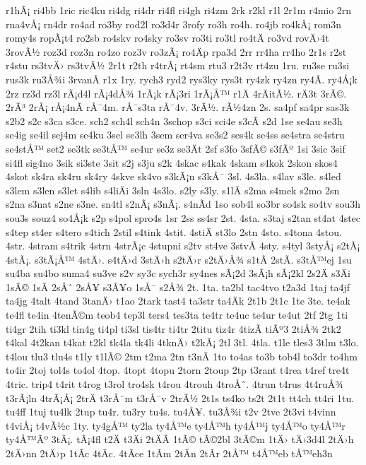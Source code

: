 {r1hÃ¡
ri4bb
1ric
ric4ku
ri4dg
ri4dr
ri4fl
ri4gh
ri4zm
2rk
r2kl
r1l
2r1m
r4mio
2rn
rna4vÅ¡
rn4dr
ro4ad
ro3by
rod2l
ro3d4r
3rofy
ro3h
ro4h.
ro4jb
ro4kÅ¡
rom3n
romy4s
ropÃ¡t4
ro2sb
ro4skv
ro4sky
ro3sv
ro3ti
ro3tl
ro4tÄ
ro3vd
rovÄ›4t
3rovÃ½
roz3d
roz3n
ro4zo
roz3v
ro3zÃ¡
ro4Äp
rpa3d
2rr
rr4ha
rr4ho
2r1s
r2st
r4stu
rs3tvÄ›
rs3tvÃ½
2r1t
r2th
r4trÃ¡
rt4sm
rtu3
r2t3v
rt4zu
1ru.
ru3se
ru3si
rus3k
ru3Å¾i
3rvanÃ­
r1x
1ry.
rych3
ryd2
rys3ky
rys3t
ry4zk
ry4zn
ry4Ã­.
ry4Å¡k
2rz
rz3d
rz3l
rÃ¡d4l
rÃ¡4dÅ¾
1rÃ¡k
rÃ¡3ri
1rÃ¡Å™
r1Ä
4rÄitÃ½.
rÄ3t
3rÃ©.
2rÃ³
2rÅ¡
rÅ¡4nÃ­
rÅ¯4m.
rÅ¯s3ta
rÅ¯4v.
3rÃ½.
rÃ½4zn
2s.
sa4pf
sa4pr
sas3k
s2b2
s2c
s3ca
s3ce.
sch2
sch4l
sch4n
3schop
s3ci
sci4e
s3cÃ­
s2d
1se
se4au
se3h
se4ig
se4il
sej4m
se4ku
3sel
se3lh
3sem
ser4va
se3s2
ses4k
se4ss
se4stra
se4stru
se4stÅ™
set2
se3tk
se3tÅ™
se4ur
se3z
se3Ät
2sf
s3fo
3sfÃ©
s3fÃº
1si
3sic
3sif
si4fl
sig4no
3sik
si3ste
3sit
s2j
s3ju
s2k
4skac
s4kak
4skam
s4kok
2skon
skos4
4skot
sk4ra
sk4ru
sk4ry
4skve
sk4vo
s3kÃ¡n
s3kÅ¯
3sl.
4s3la.
s4lav
s3le.
s4led
s3lem
s3len
s3let
s4lib
s4liÄi
3sln
4s3lo.
s2ly
s3ly.
s1lÃ­
s2ma
s4mek
s2mo
2sn
s2na
s3nat
s2ne
s3ne.
sn4tl
s2nÃ¡
s3nÃ¡.
s4nÃ­d
1so
sob4l
so3br
so4sk
so4tv
sou3h
sou3s
souz4
so4Å¡k
s2p
s4pol
spro4s
1sr
2ss
ss4sr
2st.
4sta.
s3taj
s2tan
st4at
4stec
s4tep
st4er
s4tero
s4tich
2stil
s4tink
4stit.
4stiÄ
st3lo
2stn
4sto.
s4tona
4stou.
4str.
4stram
s4trik
4strn
4strÃ¡c
4stupni
s2tv
st4ve
3stvÃ­
4sty.
s4tyl
3styÅ¡
s2tÃ¡
4stÃ¡.
s3tÃ¡Å™
4stÄ›.
s4tÄ›d
3stÄ›h
s2tÄ›r
s2tÄ›Å¾
s1tÃ­
2stÃ­.
s3tÅ™ej
1su
su4ba
su4bo
suma4
su3ve
s2v
sy3c
sych3r
sy4nes
sÃ¡2d
3sÃ¡h
sÃ¡2kl
2s2Ä
s3Äi
1sÃ©
1sÃ­
2sÅˆ
2sÅ¥
s3Å¥o
1sÅ¯
s2Å¾
2t.
1ta.
ta2bl
tac4tvo
t2a3d
1taj
ta4jf
ta4jg
4talt
4tand
3tanÄ›
t1ao
2tark
tast4
ta3str
ta4Äk
2t1b
2t1c
1te
3te.
te4ak
te4fl
te4in
4tenÃ©m
teob4
tep3l
ters4
tes3ta
te4tr
te4uc
te4ur
te4ut
2tf
2tg
1ti
ti4gr
2tih
ti3kl
tin4g
ti4pl
ti3sl
tis4tr
ti4tr
2titu
tiz4r
4tizÃ­
tiÃº3
2tiÅ¾
2tk2
t4kal
4t2kan
t4kat
t2kl
tk4la
tk4li
4tknÄ›
t2kÃ¡
2tl
3tl.
4tla.
t1le
tles3
3tlm
t3lo.
t4lou
tlu3
tlu4s
t1ly
t1lÃ©
2tm
t2ma
2tn
t3nÃ­
1to
to4as
to3b
tob4l
to3dr
to4hm
to4ir
2toj
tol4s
to4ol
4top.
4topt
4topu
2torn
2toup
2tp
t3rant
t4rea
t4ref
tre4t
4tric.
trip4
t4rit
t4rog
t3rol
tro4sk
t4rou
4trouh
4troÅˆ.
4trun
t4rus
4t4ruÅ¾
t3rÃ¡ln
4trÃ¡Å¡
2trÄ
t3rÅ¯m
t3rÅ¯v
2trÃ½
2t1s
ts4ko
ts2t
2t1t
tt4ch
tt4ri
1tu.
tu4ff
1tuj
tu4lk
2tup
tu4r.
tu3ry
tu4s.
tu4Å¥.
tu3Å¾i
t2v
2tve
2t3vi
t4vinn
t4viÅ¡
t4vÃ½c
1ty.
ty4gÅ™
ty2la
ty4Å™e
ty4Å™h
ty4Å™j
ty4Å™o
ty4Å™r
ty4Å™Ãº
3tÃ¡.
tÃ¡4fl
t2Ä
t3Äi
2tÄÃ­
1tÃ©
tÃ©2bl
3tÃ©m
1tÄ›
tÄ›3d4l
2tÄ›h
2tÄ›nn
2tÄ›p
1tÃ­c
4tÃ­c.
4tÃ­ce
1tÃ­m
2tÃ­n
2tÃ­r
2tÅ™
t4Å™eb
tÅ™eh3n
}
